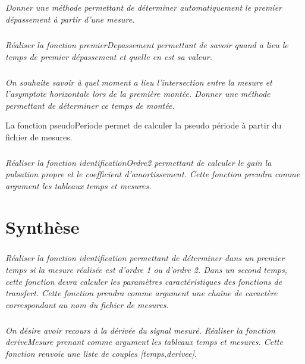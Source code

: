 \documentclass[10pt]{article}
\begin{document}
\subparagraph{}
\textit{Donner une méthode permettant de déterminer automatiquement le premier dépassement à partir d'une mesure.}

\subparagraph{}
\textit{Réaliser la fonction \textsf{premierDepassement} permettant de savoir quand a lieu le temps de premier dépassement et quelle en est sa valeur.}

\subparagraph{}
\textit{On souhaite savoir à quel moment a lieu l'intersection entre la mesure et l'asymptote horizontale lors de la première montée. Donner une méthode permettant de déterminer ce temps de montée.}

La fonction \textsf{pseudoPeriode} permet de calculer la pseudo période à partir du fichier de mesures.



\subparagraph{}
\textit{Réaliser la fonction \textsf{identificationOrdre2} permettant de calculer le gain la pulsation propre et le coefficient d'amortissement. Cette fonction prendra comme argument les tableaux \textsf{temps} et \textsf{mesures}.}




\section{Synthèse}

\subparagraph{}
\textit{Réaliser la fonction \textsf{identification} permettant de déterminer dans un premier temps si la mesure réalisée est d'ordre 1 ou d'ordre 2. Dans un second temps, cette fonction devra calculer les paramètres caractéristiques des fonctions de transfert. Cette fonction prendra comme argument une chaîne de caractère correspondant au nom du fichier de mesures.}

\subparagraph{}
\textit{On désire avoir recours à la dérivée du signal mesuré. Réaliser la fonction \textsf{deriveMesure} prenant comme argument les tableaux \textsf{temps} et \textsf{mesures}. Cette fonction renvoie une liste de couples \textsf{[temps,derivee]}.}
\end{document}
